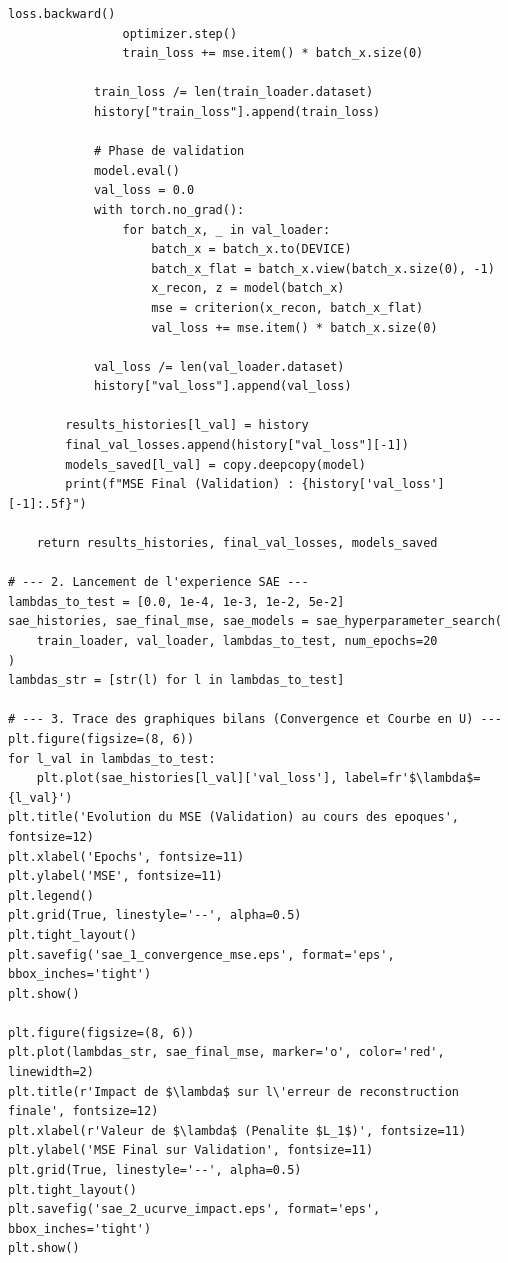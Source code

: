 \documentclass[11pt,a4paper]{report}
\begin{document}
\begin{lstlisting}[caption=Pipeline d'exploration et d'analyse des profils du SAE]
                loss.backward()
                optimizer.step()
                train_loss += mse.item() * batch_x.size(0) 
                
            train_loss /= len(train_loader.dataset)
            history["train_loss"].append(train_loss)
            
            # Phase de validation
            model.eval()
            val_loss = 0.0
            with torch.no_grad():
                for batch_x, _ in val_loader:
                    batch_x = batch_x.to(DEVICE)
                    batch_x_flat = batch_x.view(batch_x.size(0), -1)
                    x_recon, z = model(batch_x)
                    mse = criterion(x_recon, batch_x_flat)
                    val_loss += mse.item() * batch_x.size(0)
                    
            val_loss /= len(val_loader.dataset)
            history["val_loss"].append(val_loss)
            
        results_histories[l_val] = history
        final_val_losses.append(history["val_loss"][-1])
        models_saved[l_val] = copy.deepcopy(model)
        print(f"MSE Final (Validation) : {history['val_loss'][-1]:.5f}")
        
    return results_histories, final_val_losses, models_saved

# --- 2. Lancement de l'experience SAE ---
lambdas_to_test = [0.0, 1e-4, 1e-3, 1e-2, 5e-2]
sae_histories, sae_final_mse, sae_models = sae_hyperparameter_search(
    train_loader, val_loader, lambdas_to_test, num_epochs=20
)
lambdas_str = [str(l) for l in lambdas_to_test]

# --- 3. Trace des graphiques bilans (Convergence et Courbe en U) ---
plt.figure(figsize=(8, 6))
for l_val in lambdas_to_test:
    plt.plot(sae_histories[l_val]['val_loss'], label=fr'$\lambda$={l_val}')
plt.title('Evolution du MSE (Validation) au cours des epoques', fontsize=12)
plt.xlabel('Epochs', fontsize=11)
plt.ylabel('MSE', fontsize=11)
plt.legend()
plt.grid(True, linestyle='--', alpha=0.5)
plt.tight_layout()
plt.savefig('sae_1_convergence_mse.eps', format='eps', bbox_inches='tight')
plt.show()

plt.figure(figsize=(8, 6))
plt.plot(lambdas_str, sae_final_mse, marker='o', color='red', linewidth=2)
plt.title(r'Impact de $\lambda$ sur l\'erreur de reconstruction finale', fontsize=12)
plt.xlabel(r'Valeur de $\lambda$ (Penalite $L_1$)', fontsize=11)
plt.ylabel('MSE Final sur Validation', fontsize=11)
plt.grid(True, linestyle='--', alpha=0.5)
plt.tight_layout()
plt.savefig('sae_2_ucurve_impact.eps', format='eps', bbox_inches='tight')
plt.show()


\end{lstlisting}
\end{document}
